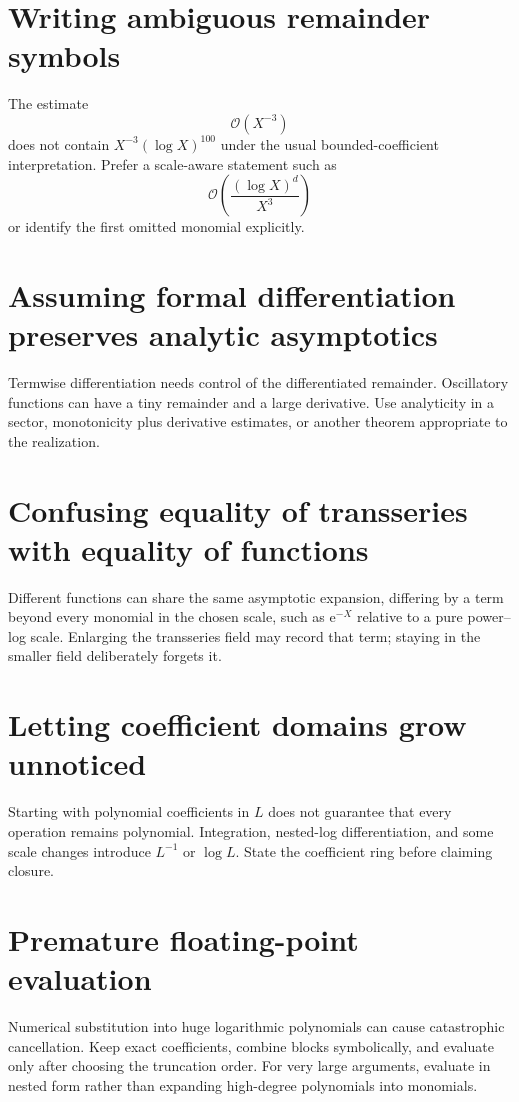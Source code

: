 \documentclass[11pt,oneside]{book}
\theoremstyle{definition}
\theoremstyle{remark}
\newcommand{\e}{\mathrm e}
\newcommand{\bigO}{\mathcal O}
\begin{document}
\section{Writing ambiguous remainder symbols}
The estimate
\[
 \bigO(X^{-3})
\]
does not contain $X^{-3}(\log X)^{100}$ under the usual bounded-coefficient
interpretation. Prefer a scale-aware statement such as
\[
 \bigO\!\left(\frac{(\log X)^d}{X^3}\right)
\]
or identify the first omitted monomial explicitly.

\section{Assuming formal differentiation preserves analytic asymptotics}
Termwise differentiation needs control of the differentiated remainder.
Oscillatory functions can have a tiny remainder and a large derivative.
Use analyticity in a sector, monotonicity plus derivative estimates, or
another theorem appropriate to the realization.

\section{Confusing equality of transseries with equality of functions}
Different functions can share the same asymptotic expansion, differing by a
term beyond every monomial in the chosen scale, such as $\e^{-X}$ relative
to a pure power--log scale. Enlarging the transseries field may record that
term; staying in the smaller field deliberately forgets it.

\section{Letting coefficient domains grow unnoticed}
Starting with polynomial coefficients in $L$ does not guarantee that every
operation remains polynomial. Integration, nested-log differentiation, and
some scale changes introduce $L^{-1}$ or $\log L$. State the coefficient
ring before claiming closure.

\section{Premature floating-point evaluation}
Numerical substitution into huge logarithmic polynomials can cause
catastrophic cancellation. Keep exact coefficients, combine blocks
symbolically, and evaluate only after choosing the truncation order.
For very large arguments, evaluate in nested form rather than expanding
high-degree polynomials into monomials.
\end{document}
